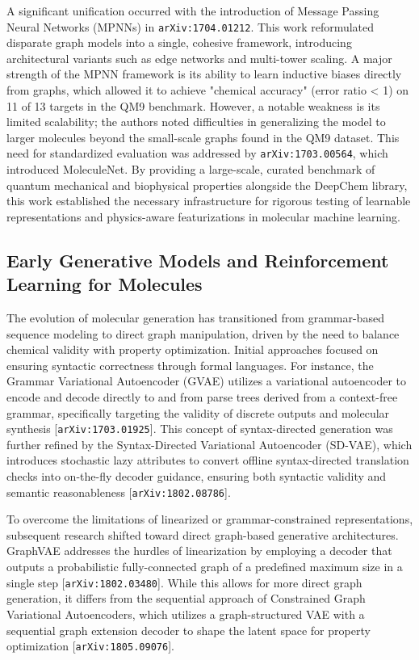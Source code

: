 \documentclass[11pt]{article}
\begin{document}
A significant unification occurred with the introduction of Message Passing Neural Networks (MPNNs) in \texttt{arXiv:1704.01212}. This work reformulated disparate graph models into a single, cohesive framework, introducing architectural variants such as edge networks and multi-tower scaling. A major strength of the MPNN framework is its ability to learn inductive biases directly from graphs, which allowed it to achieve "chemical accuracy" (error ratio < 1) on 11 of 13 targets in the QM9 benchmark. However, a notable weakness is its limited scalability; the authors noted difficulties in generalizing the model to larger molecules beyond the small-scale graphs found in the QM9 dataset. This need for standardized evaluation was addressed by \texttt{arXiv:1703.00564}, which introduced MoleculeNet. By providing a large-scale, curated benchmark of quantum mechanical and biophysical properties alongside the DeepChem library, this work established the necessary infrastructure for rigorous testing of learnable representations and physics-aware featurizations in molecular machine learning.

\subsection{Early Generative Models and Reinforcement Learning for Molecules}

The evolution of molecular generation has transitioned from grammar-based sequence modeling to direct graph manipulation, driven by the need to balance chemical validity with property optimization. Initial approaches focused on ensuring syntactic correctness through formal languages. For instance, the Grammar Variational Autoencoder (GVAE) utilizes a variational autoencoder to encode and decode directly to and from parse trees derived from a context-free grammar, specifically targeting the validity of discrete outputs and molecular synthesis [\texttt{arXiv:1703.01925}]. This concept of syntax-directed generation was further refined by the Syntax-Directed Variational Autoencoder (SD-VAE), which introduces stochastic lazy attributes to convert offline syntax-directed translation checks into on-the-fly decoder guidance, ensuring both syntactic validity and semantic reasonableness [\texttt{arXiv:1802.08786}].

To overcome the limitations of linearized or grammar-constrained representations, subsequent research shifted toward direct graph-based generative architectures. GraphVAE addresses the hurdles of linearization by employing a decoder that outputs a probabilistic fully-connected graph of a predefined maximum size in a single step [\texttt{arXiv:1802.03480}]. While this allows for more direct graph generation, it differs from the sequential approach of Constrained Graph Variational Autoencoders, which utilizes a graph-structured VAE with a sequential graph extension decoder to shape the latent space for property optimization [\texttt{arXiv:1805.09076}].
\end{document}
